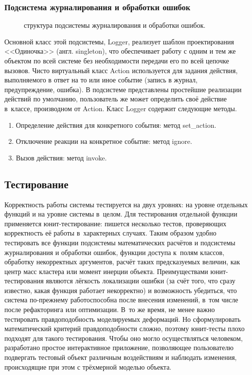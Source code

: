 \documentclass[a4paper, 14pt, titlepage]{extarticle}
\newcommand{\eng}[1]{{\English #1}}
\newcommand{\includefigure}[3][]{
    \begin{figure}[!htb]
      \center{\texttt{[image: \#2]}}
      \caption{#3} \label{fig:#2}
    \end{figure}
  }
\begin{document}
      \subsubsection{Подсистема журналирования и обработки ошибок}
        \includefigure{logging}{структура подсистемы журналирования и обработки ошибок.}

        Основной класс этой подсистемы, Logger, реализует шаблон проектирования <<Одиночка>> (англ.
        \eng{singleton}), что обеспечивает работу с одним и тем же объектом по всей системе без
        необходимости передачи его по всей цепочке вызовов. Чисто виртуальный класс Action
        используется для задания действия, выполняемого в ответ на то или иное событие (запись в
        журнал, предупреждение, ошибка). В подсистеме представлены простейшие реализации действий по
        умолчанию, пользователь же может определить своё действие в~классе, производном от Action. Класс
        Logger содержит следующие методы.
        \begin{enumerate}
          \item Определение действия для конкретного события: метод set\_action.
          \item Отключение реакции на конкретное событие: метод ignore.
          \item Вызов действия: метод invoke.
        \end{enumerate}

    \subsection{Тестирование}

      Корректность работы системы тестируется на двух уровнях: на уровне отдельных функций и на
      уровне системы в~целом. Для тестирования отдельной функции применяется юнит-тестирование:
      пишется несколько тестов, проверяющих корректность её работы в~характерных случаях. Таким
      образом удобно тестировать все функции подсистемы математических расчётов и подсистемы
      журналирования и обработки ошибок, функции доступа к~полям классов, обработку некорректных
      аргументов, расчёт таких предсказуемых величин, как центр масс кластера или
      момент инерции объекта. Преимуществами юнит-тестирования являются лёгкость локализации ошибки
      (за счёт того, что сразу известно, какая функция работает некорректно) и возможность
      убедиться, что система по-прежнему работоспособна после внесения изменений, в~том числе
      после рефакторинга или оптимизации. В~то же время, не менее важно тестировать правдоподобность
      моделируемых деформаций. Но сформулировать математический критерий правдоподобности сложно,
      поэтому юнит-тесты плохо подходят для такого тестирования. Чтобы оно могло осуществляться
      человеком, разработано простое интерактивное приложение, позволяющее пользователю подвергать
      тестовый объект различным воздействиям и наблюдать изменения, происходящие при этом с
      трёхмерной моделью объекта.
\end{document}
